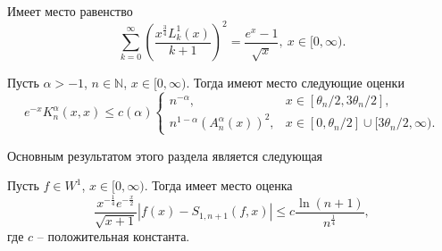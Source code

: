\begin{lemma}
Имеет место равенство
\begin{equation*}
\sum_{k=0}^{\infty}\left(\frac{x^{\frac34}L_k^1(x)}{k+1}\right)^2 = \frac{e^{x}-1}{\sqrt{x}}, \ x\in[0,\infty).
\end{equation*}
\end{lemma}

\begin{lemma}
\cite{Gadzhimirzaev:mathnot2021}	
Пусть $\alpha>-1$, $n\in\mathbb{N}$, $x\in[0,\infty)$. Тогда имеют место следующие оценки
\begin{equation*}
e^{-x}K_{n}^\alpha(x,x)\le c(\alpha)
\begin{cases}
n^{-\alpha}, & x\in[\theta_n/2, 3\theta_n/2], \\
n^{1-\alpha}(A_n^\alpha(x))^2, & x\in[0,\theta_n/2]\cup[3\theta_n/2,\infty).
\end{cases}
\end{equation*}
\end{lemma}

Основным результатом этого раздела является следующая
\begin{theorem}\label{Gadzhimirzaev:theorem1}
Пусть $f\in W^1$, $x\in[0,\infty)$. Тогда имеет место оценка
$$
\frac{x^{-\frac14}e^{-\frac x2}}{\sqrt{x+1}}|f(x)-S_{1,n+1}(f,x)|\le c
\frac{\ln(n+1)}{n^{\frac14}},
$$
где $c$ -- положительная константа.
\end{theorem}

